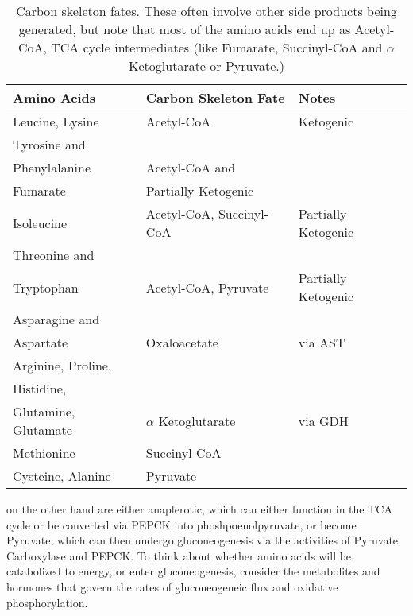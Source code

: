 \documentclass{tufte-handout}
\begin{document}
\begin{table}[]
\centering
\caption{Carbon skeleton fates.  These often involve other side products being generated, but note that most of the amino acids end up as Acetyl-CoA, TCA cycle intermediates (like Fumarate, Succinyl-CoA and $\alpha$ Ketoglutarate or Pyruvate.)}
\label{tab:carbon-skeletons}
\begin{tabular}{lll}
\textbf{Amino Acids}                                        & \textbf{Carbon Skeleton Fate}        & \textbf{Notes}                 \\ \hline
Leucine, Lysine                                    & Acetyl-CoA                  & Ketogenic  \\ \hline
Tyrosine and\\ Phenylalanine                         & Acetyl-CoA and\\ Fumarate     & Partially Ketogenic   \\ \hline
Isoleucine                                         & Acetyl-CoA, Succinyl-CoA & Partially Ketogenic   \\ \hline
Threonine and\\ Tryptophan                           & Acetyl-CoA, Pyruvate     & Partially Ketogenic   \\ \hline
Asparagine and\\ Aspartate                           & Oxaloacetate                & via AST               \\ \hline
Arginine, Proline,\\ Histidine,\\ Glutamine, Glutamate & $\alpha$ Ketoglutarate      & via GDH               \\ \hline
Methionine                                         & Succinyl-CoA                &                       \\ \hline
Cysteine, Alanine                                  & Pyruvate                    &                      
\end{tabular}
\end{table}

 on the other hand are either anaplerotic, which can either function in the TCA cycle or be converted via PEPCK into phoshpoenolpyruvate, or become Pyruvate, which can then undergo gluconeogenesis via the activities of Pyruvate Carboxylase and PEPCK.  To think about whether amino acids will be catabolized to energy, or enter gluconeogenesis, consider the metabolites and hormones that govern the rates of gluconeogeneic flux and oxidative phosphorylation.



\end{document}

